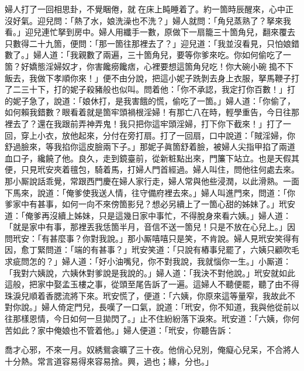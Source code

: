 婦人打了一回相思卦，不覺睏倦，就𢱉在床上盹睡着了。約一箇時辰醒來，心中正沒好氣。{}迎兒問：「熱了水，娘洗澡也不洗？」婦人就問：「角兒蒸熟了？拏來我看。」迎兒連忙拏到房中。婦人用纖手一數，原做下一扇籠三十箇角兒，翻來覆去只數得二十九箇，便問：「那一箇往那裡去了？」迎兒道：「我並沒看見，只怕娘錯數了。」婦人道：「我親數了兩遍，三十箇角兒，要等你爹來吃。你如何偷吃了一箇？好嬌態淫婦奴才，{}你害饞癆饞痞，心裡要想這箇角兒吃！你大碗小碗𠳹搗不下飯去，我做下孝順你來！」便不由分說，把這小妮子跣剝去身上衣服，拏馬鞭子打了二三十下，打的妮子殺豬般也似叫。問着他：「你不承認，我定打你百數！」打的妮子急了，說道：「娘休打，是我害餓的慌，偷吃了一箇。」婦人道：「你偷了，如何賴我錯數？眼看着就是箇牢頭禍根淫婦！有那亡八在時，輕學重告，今日往那裡去了？還在我跟前弄神弄鬼！{}我只把你這牢頭淫婦，打下你下截來！」打了一回，穿上小衣，放他起來，分付在旁打扇。打了一回扇，口中說道：「賊淫婦，你舒過臉來，等我掐你這皮臉兩下子。」那妮子眞箇舒着臉，被婦人尖指甲掐了兩道血口子，{}纔饒了他。良久，走到鏡臺前，從新粧點出來，門簾下站立。也是天假其便，只見玳安夾着氊包，騎着馬，打婦人門首經過。婦人叫住，問他往何處去來。那小厮說話乖覺，常跟西門慶在婦人家行走，婦人常與他些浸潤，以此滑熟。一面下馬來，說道：「俺爹使我送人情，往守備府裡去來。」婦人叫進門來，問道：「你爹家中有甚事，如何一向不來傍箇影兒？想必另續上了一箇心甜的姊妹了。」玳安道：「俺爹再沒續上姊妹，只是這幾日家中事忙，不得脫身來看六姨。」婦人道：「就是家中有事，那裡丟我恁箇半月，音信不送一箇兒！只是不放在心兒上。」因問玳安：「有甚麼事？你對我說。」那小厮嘻嘻只是笑，不肯說。{}婦人見玳安笑得有因，愈丁緊問道：「端的有甚事？」玳安笑道：「只說有樁事兒罷了，六姨只顧吹毛求疵問怎的？」婦人道：「好小油嘴兒，你不對我說，我就惱你一生。」{}小厮道：「我對六姨說，六姨休對爹說是我說的。」婦人道：「我決不對他說。」玳安就如此這般，把家中娶孟玉樓之事，從頭至尾告訴了一遍。這婦人不聽便罷，聽了由不得珠淚兒順着香腮流將下來。玳安慌了，便道：「六姨，你原來這等量窄，我故此不對你說。」婦人倚定門兒，長嘆了一口氣，說道：「玳安，你不知道，我與他從前以往那樣恩情，今日如何一旦拋閃了。」止不住紛紛落下淚來。玳安道：「六姨，你何苦如此？家中俺娘也不管着他。」婦人便道：「玳安，你聽告訴：

\begin{myquote} 
喬才心邪，不來一月。奴綉鴛衾曠了三十夜。他俏心兒別，俺癡心兒呆，不合將人十分熱。常言道容易得來容易捨。興，過也；緣，分也。」
\end{myquote} 

